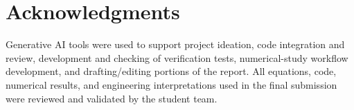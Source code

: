 \section{Acknowledgments}
Generative AI tools were used to support project ideation, code integration
and review, development and checking of verification tests, numerical-study
workflow development, and drafting/editing portions of the report. All
equations, code, numerical results, and engineering interpretations used
in the final submission were reviewed and validated by the student team.
